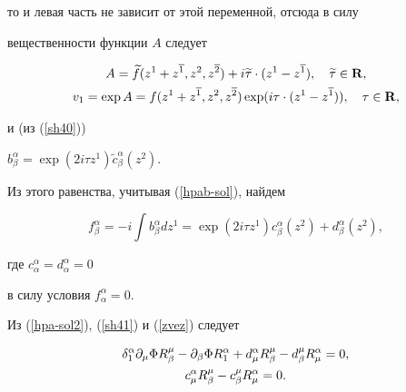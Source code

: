 то и левая часть не зависит от этой переменной, отсюда в силу


вещественности функции $A$ следует


\begin{gather*}


A =\widetilde f (z^1 +z^{\ol 1},z^2,z^{\ol 2}) +i\widetilde \tau\cdot


(z^1-z^{\ol 1}), \quad \widetilde \tau \in{\bold R},\\


v_1 = \exp A = f (z^1 +z^{\ol 1},z^2,z^{\ol 2})\exp (i \tau\cdot


(z^1 - z^{\ol 1})), \quad \tau \in{\bold R},


\end{gather*}


и (из (\ref{sh40}))


$b^\alpha_\beta = \exp (2i\tau z^1) \widetilde c^\alpha_\beta(z^2)$.


Из этого равенства, учитывая (\ref{hpab-sol}), найдем


\begin{equation}


\label{sh41}


f^\alpha_\beta = -i\int b^\alpha_\beta dz^1 =


\exp (2i\tau z^1) c^\alpha_\beta(z^2) +d^\alpha_\beta(z^2),


\end{equation}


где $c^\alpha_\alpha = d^\alpha_\alpha =0$


в силу условия $f^\alpha_\alpha =0$.





Из (\ref{hpa-sol2}), (\ref{sh41}) и (\ref{zvez}) следует


\begin{gather}


\label{sh43}


\delta^\alpha_1 \pl\mu \Phi R^\mu_\beta -\pl\beta\Phi R^\alpha_1


+d^\alpha_\mu R^\mu_\beta - d^\mu_\beta R^\alpha_\mu = 0,\\


\label{sh44}


c^\alpha_\mu R^\mu_\beta - c^\mu_\beta R^\alpha_\mu = 0.


\end{gather}






